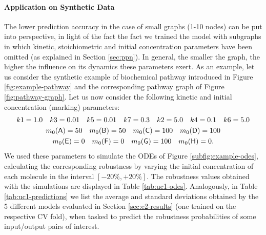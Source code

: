 \paragraph{Application on Synthetic Data}
The lower prediction accuracy in the case of small graphs (1-10 nodes) can be put into perspective, in light of the fact the fact we trained the model with subgraphs in which kinetic, stoichiometric and initial concentration parameters have been omitted (as explained in Section \ref{sec:ppn}). In general, the smaller the graph, the higher the influence on its dynamics these parameters exert. As an example, let us consider the synthetic example of biochemical pathway introduced in Figure \ref{fig:example-pathway} and the corresponding pathway graph of Figure \ref{fig:pathway-graph}. Let us now consider the following kinetic and initial concentration (marking) parameters:
\begin{gather*}
  k1 = 1.0 \quad
  k3 = 0.01 \quad
  k5 = 0.01 \quad
  k7 = 0.3  \quad
  k2 = 5.0  \quad
  k4 = 0.1  \quad
  k6 = 5.0 \\
  m_0(\mathsf{A}) = 50\quad
  m_0(\mathsf{B}) = 50\quad
  m_0(\mathsf{C}) = 100\quad
  m_0(\mathsf{D}) = 100\\
  m_0(\mathsf{E}) = 0\quad
  m_0(\mathsf{F}) = 0\quad
  m_0(\mathsf{G}) = 100\quad
  m_0(\mathsf{H}) = 0.
\end{gather*}
We used these parameters to simulate the ODEs of Figure \ref{subfig:example-odes}, calculating the corresponding robustness by varying the initial concentration of each molecule in the interval $[-20\%,+20\%]$. The robustness values obtained with the simulations are displayed in Table \ref{tab:uc1-odes}. Analogously, in Table \ref{tab:uc1-predictions} we list the average and standard deviations obtained by the 5 different models evaluated in Section \ref{sec:e2-results} (one trained on the respective CV fold), when tasked to predict the robustness probabilities of some input/output pairs of interest.

